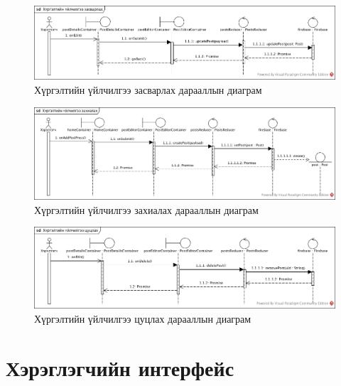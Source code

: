 \begin{figure}[H]
	\centering
	\includegraphics[width=\textwidth]{Figures/zohiomj/seq/hurgeltiin_uilchilgee_zasvarlah.jpg}
	\caption{Хүргэлтийн үйлчилгээ засварлах дарааллын диаграм}
\end{figure}

\begin{figure}[H]
	\centering
	\includegraphics[width=\textwidth]{Figures/zohiomj/seq/hurgeltiin_uilchilgee_zahialah.jpg}
	\caption{Хүргэлтийн үйлчилгээ захиалах дарааллын диаграм}
\end{figure}

\begin{figure}[H]
	\centering
	\includegraphics[width=\textwidth]{Figures/zohiomj/seq/hurgeltiin_uilchilgee_tsutslah.jpg}
	\caption{Хүргэлтийн үйлчилгээ цуцлах дарааллын диаграм}
\end{figure}



\section{Хэрэглэгчийн интерфейс}

